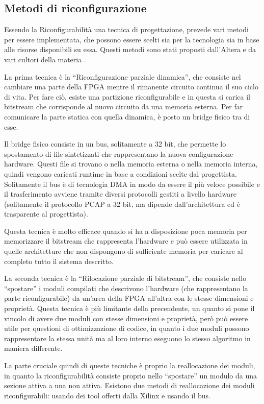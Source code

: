 \documentclass[a4paper,titlepage]{book}
\begin{document}
\subsection{Metodi di riconfigurazione}

Essendo la Riconfigurabilità una tecnica di progettazione, prevede vari metodi per essere implementata, che possono essere scelti sia per la tecnologia sia in base alle risorse disponibili su essa. Questi metodi sono stati proposti dall'Altera \cite{PR1} e da vari cultori della materia \cite{PR2}.

La prima tecnica è la ``Riconfigurazione parziale dinamica'', che consiste nel cambiare una parte della FPGA mentre il rimanente circuito continua il suo ciclo di vita. Per fare ciò, esiste una partizione riconfigurabile e in questa si carica il bitstream che corrisponde al nuovo circuito da una memoria esterna. Per far comunicare la parte statica con quella dinamica, è posto un bridge fisico tra di esse.

Il bridge fisico consiste in un bus, solitamente a 32 bit, che permette lo spostamento di file sintetizzati che rappresentano la nuova configurazione hardware. Questi file si trovano o nella memoria esterna o nella memoria interna, quindi vengono caricati runtime in base a condizioni scelte dal progettista. Solitamente il bus è di tecnologia DMA in modo da essere il più veloce possibile e il trasferimento avviene tramite diversi protocolli gestiti a livello hardware (solitamente il protocollo PCAP a 32 bit, ma dipende dall'architettura ed è trasparente al progettista).

Questa tecnica è molto efficace quando si ha a disposizione poca memoria per memorizzare il bitstream che rappresenta l'hardware e può essere utilizzata in quelle architetture che non dispongono di sufficiente memoria per caricare al completo tutto il sistema descritto.


La seconda tecnica è la ``Rilocazione parziale di bitstream'', che consiste nello ``spostare'' i moduli compilati che descrivono l'hardware (che rappresentano la parte riconfigurabile) da un'area della FPGA all'altra con le stesse dimensioni e proprietà. Questa tecnica è più limitante della precendente, un quanto si pone il vincolo di avere due moduli con stesse dimensioni e proprietà, però può essere utile per questioni di ottimizzazione di codice, in quanto i due moduli possono rappresentare la stessa unità ma al loro interno eseguono lo stesso algoritmo in maniera differente.

La parte cruciale quindi di queste tecniche è proprio la reallocazione dei moduli, in quanto la riconfigurabilità consiste proprio nello ``spostare'' un modulo da una sezione attiva a una non attiva. Esistono due metodi di reallocazione dei moduli riconfigurabili: usando dei tool offerti dalla Xilinx e usando il bus.
\end{document}

